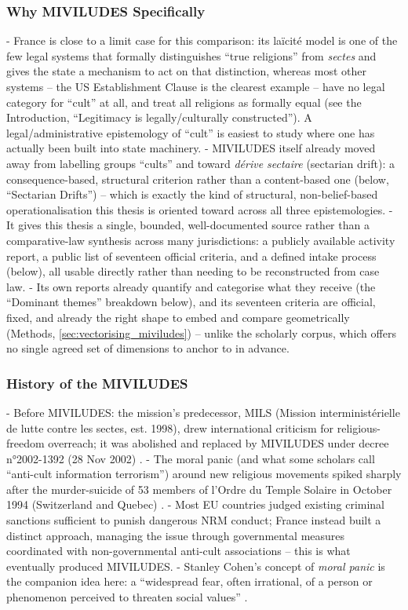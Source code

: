 \subsubsection{Why MIVILUDES Specifically}
- France is close to a limit case for this comparison: its la\"icit\'e model is one of the few legal systems that formally distinguishes \enquote{true religions} from \textit{sectes} and gives the state a mechanism to act on that distinction, whereas most other systems -- the US Establishment Clause is the clearest example -- have no legal category for \enquote{cult} at all, and treat all religions as formally equal (see the Introduction, \enquote{Legitimacy is legally/culturally constructed}). A legal/administrative epistemology of \enquote{cult} is easiest to study where one has actually been built into state machinery.
- MIVILUDES itself already moved away from labelling groups \enquote{cults} and toward \textit{dérive sectaire} (sectarian drift): a consequence-based, structural criterion rather than a content-based one (below, \enquote{Sectarian Drifts}) -- which is exactly the kind of structural, non-belief-based operationalisation this thesis is oriented toward across all three epistemologies.
- It gives this thesis a single, bounded, well-documented source rather than a comparative-law synthesis across many jurisdictions: a publicly available activity report, a public list of seventeen official criteria, and a defined intake process (below), all usable directly rather than needing to be reconstructed from case law.
- Its own reports already quantify and categorise what they receive (the \enquote{Dominant themes} breakdown below), and its seventeen criteria are official, fixed, and already the right shape to embed and compare geometrically (Methods, \ref{sec:vectorising_miviludes}) -- unlike the scholarly corpus, which offers no single agreed set of dimensions to anchor to in advance.

\subsubsection{History of the MIVILUDES}
- Before MIVILUDES: the mission's predecessor, MILS (Mission interministérielle de lutte contre les sectes, est. 1998), drew international criticism for religious-freedom overreach; it was abolished and replaced by MIVILUDES under decree n°2002-1392 (28 Nov 2002) \autocite{decret2002-1392}.
- The moral panic (and what some scholars call ``anti-cult information terrorism'') around new religious movements spiked sharply after the murder-suicide of 53 members of l'Ordre du Temple Solaire in October 1994 (Switzerland and Quebec) \autocite[pp.4]{adeliyantousUsingLawLimit2023}.
- Most EU countries judged existing criminal sanctions sufficient to punish dangerous NRM conduct; France instead built a distinct approach, managing the issue through governmental measures coordinated with non-governmental anti-cult associations \autocite[pp.4]{adeliyantousUsingLawLimit2023} -- this is what eventually produced MIVILUDES.
- Stanley Cohen's concept of \textit{moral panic} is the companion idea here: a ``widespread fear, often irrational, of a person or phenomenon perceived to threaten social values'' \autocite{cohenFolkDevilsMoral2011}.

